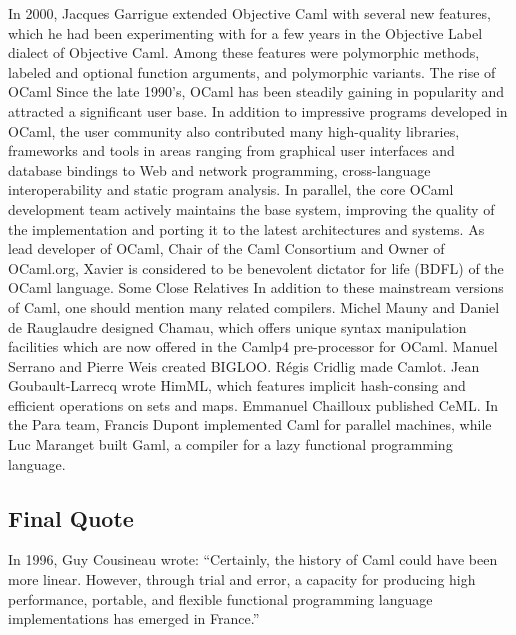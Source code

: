 \documentclass[14pt]{matmex-diploma-custom}
\begin{document}
In 2000, Jacques Garrigue extended Objective Caml with several new features, which he had been experimenting with for a few years in the Objective Label dialect of Objective Caml. Among these features were polymorphic methods, labeled and optional function arguments, and polymorphic variants.
The rise of OCaml
Since the late 1990's, OCaml has been steadily gaining in popularity and attracted a significant user base. In addition to impressive programs developed in OCaml, the user community also contributed many high-quality libraries, frameworks and tools in areas ranging from graphical user interfaces and database bindings to Web and network programming, cross-language interoperability and static program analysis. In parallel, the core OCaml development team actively maintains the base system, improving the quality of the implementation and porting it to the latest architectures and systems. As lead developer of OCaml, Chair of the Caml Consortium and Owner of OCaml.org, Xavier is considered to be benevolent dictator for life (BDFL) of the OCaml language.
Some Close Relatives
In addition to these mainstream versions of Caml, one should mention many related compilers. Michel Mauny and Daniel de Rauglaudre designed Chamau, which offers unique syntax manipulation facilities which are now offered in the Camlp4 pre-processor for OCaml.
Manuel Serrano and Pierre Weis created BIGLOO. Régis Cridlig made Camlot. Jean Goubault-Larrecq wrote HimML, which features implicit hash-consing and efficient operations on sets and maps. Emmanuel Chailloux published CeML. In the Para team, Francis Dupont implemented Caml for parallel machines, while Luc Maranget built Gaml, a compiler for a lazy functional programming language.
\subsection{Final Quote}
In 1996, Guy Cousineau wrote: “Certainly, the history of Caml could have been more linear. However, through trial and error, a capacity for producing high performance, portable, and flexible functional programming language implementations has emerged in France.”
\end{document}
